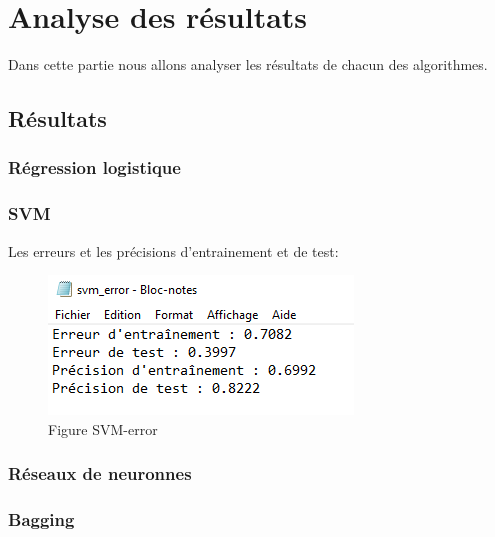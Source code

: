 \chapter{Analyse des résultats}
\par Dans cette partie nous allons analyser les résultats de chacun des algorithmes.
\section{Résultats}
\subsection{Régression logistique}
\subsection{SVM}
\par Les erreurs et les précisions d'entrainement et de test:
\begin{figure}[H]
    \centering
    \includegraphics{svm.png}
    \caption{Figure SVM-error }
    \label{Figure fichier svm-error }
\end{figure}
\subsection{Réseaux de neuronnes}
\subsection{Bagging}
